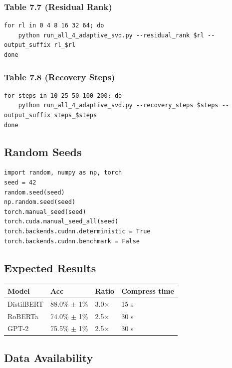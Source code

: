 \subsubsection{Table 7.7 (Residual Rank)}

\begin{lstlisting}
for rl in 0 4 8 16 32 64; do
    python run_all_4_adaptive_svd.py --residual_rank $rl --output_suffix rl_$rl
done
\end{lstlisting}

\subsubsection{Table 7.8 (Recovery Steps)}

\begin{lstlisting}
for steps in 10 25 50 100 200; do
    python run_all_4_adaptive_svd.py --recovery_steps $steps --output_suffix steps_$steps
done
\end{lstlisting}

\subsection{Random Seeds}

\begin{lstlisting}
import random, numpy as np, torch
seed = 42
random.seed(seed)
np.random.seed(seed)
torch.manual_seed(seed)
torch.cuda.manual_seed_all(seed)
torch.backends.cudnn.deterministic = True
torch.backends.cudnn.benchmark = False
\end{lstlisting}

\subsection{Expected Results}

\begin{table}[H]
\centering
\small
\begin{tabular}{llll}
\toprule
\textbf{Model} & \textbf{Acc} & \textbf{Ratio} & \textbf{Compress time} \\
\midrule
DistilBERT & 88.0\% $\pm$ 1\% & 3.0$\times$ & 15 s \\
RoBERTa & 74.0\% $\pm$ 1\% & 2.5$\times$ & 30 s \\
GPT-2 & 75.5\% $\pm$ 1\% & 2.5$\times$ & 30 s \\
\bottomrule
\end{tabular}
\end{table}

\subsection{Data Availability}

